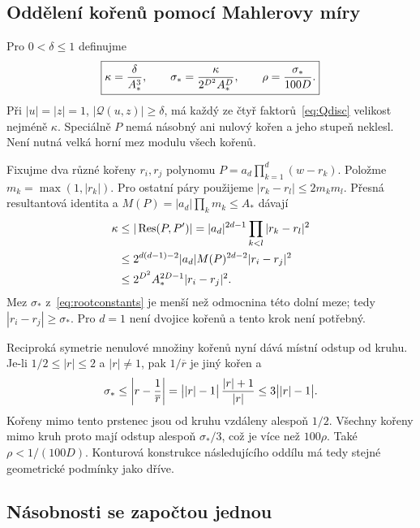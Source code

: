 \documentclass[11pt,a4paper]{article}
\theoremstyle{remark}\newtheorem{remark}[theorem]{Poznámka}
\numberwithin{equation}{section}
\begin{document}
\subsection{Oddělení kořenů pomocí Mahlerovy míry}

Pro \(0<\delta\le1\) definujme
\begin{equation}
\boxed{\kappa={\delta\over A_*^3},\qquad
\sigma_*={\kappa\over2^{D^2}A_*^D},\qquad
\rho={\sigma_*\over100D}.}
\label{eq:rootconstants}
\end{equation}
Při \(|u|=|z|=1\), \(|\mathscr Q(u,z)|\ge\delta\), má každý ze čtyř faktorů~\eqref{eq:Qdisc} velikost nejméně \(\kappa\). Speciálně \(P\) nemá násobný ani nulový kořen a jeho stupeň neklesl. Není nutná velká horní mez modulu všech kořenů.

Fixujme dva různé kořeny \(r_i,r_j\) polynomu \(P=a_d\prod_{k=1}^d(w-r_k)\). Položme \(m_k=\max(1,|r_k|)\). Pro ostatní páry použijeme \(|r_k-r_l|\le2m_km_l\). Přesná resultantová identita a \(M(P)=|a_d|\prod_km_k\le A_*\) dávají
\begin{align}
\kappa&\le|\operatorname{Res}(P,P')|
=|a_d|^{2d-1}\prod_{k<l}|r_k-r_l|^2\notag\\
&\le2^{d(d-1)-2}|a_d|M(P)^{2d-2}|r_i-r_j|^2\notag\\
&\le2^{D^2}A_*^{2D-1}|r_i-r_j|^2.
\label{eq:rootsep-sharp}
\end{align}
Mez \(\sigma_*\) z~\eqref{eq:rootconstants} je menší než odmocnina této dolní meze; tedy \(|r_i-r_j|\ge\sigma_*\). Pro \(d=1\) není dvojice kořenů a tento krok není potřebný.

Reciproká symetrie nenulové množiny kořenů nyní dává místní odstup od kruhu. Je-li \(1/2\le|r|\le2\) a \(|r|\ne1\), pak \(1/\overline r\) je jiný kořen a
\[
\sigma_*\le\left|r-{1\over\overline r}\right|
=\bigl||r|-1\bigr|\,{|r|+1\over|r|}
\le3\bigl||r|-1\bigr|.
\]
Kořeny mimo tento prstenec jsou od kruhu vzdáleny alespoň \(1/2\). Všechny kořeny mimo kruh proto mají odstup alespoň \(\sigma_*/3\), což je více než \(100\rho\). Také \(\rho<1/(100D)\). Konturová konstrukce následujícího oddílu má tedy stejné geometrické podmínky jako dříve.

\subsection{Násobnosti se započtou jednou}
\end{document}
